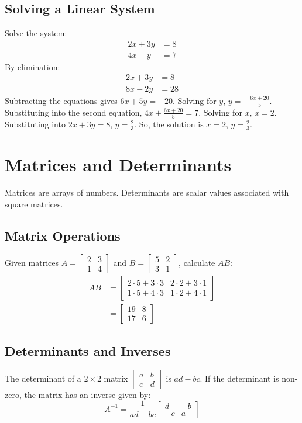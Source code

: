 \documentclass{article}
\begin{document}
\subsection{Solving a Linear System}
Solve the system:
\begin{align*}
    2x + 3y &= 8 \\
    4x - y &= 7
\end{align*}
By elimination:
\begin{align*}
    2x + 3y &= 8 \\
    8x - 2y &= 28
\end{align*}
Subtracting the equations gives $6x + 5y = -20$. Solving for $y$, $y = -\frac{6x + 20}{5}$. Substituting into the second equation, $4x + \frac{6x + 20}{5} = 7$. Solving for $x$, $x = 2$. Substituting into $2x + 3y = 8$, $y = \frac{2}{3}$. So, the solution is $x = 2$, $y = \frac{2}{3}$.

\section{Matrices and Determinants}
Matrices are arrays of numbers. Determinants are scalar values associated with square matrices.

\subsection{Matrix Operations}
Given matrices $A = \begin{bmatrix} 2 & 3 \\ 1 & 4 \end{bmatrix}$ and $B = \begin{bmatrix} 5 & 2 \\ 3 & 1 \end{bmatrix}$, calculate $AB$:
\begin{align*}
    AB &= \begin{bmatrix} 2 \cdot 5 + 3 \cdot 3 & 2 \cdot 2 + 3 \cdot 1 \\ 1 \cdot 5 + 4 \cdot 3 & 1 \cdot 2 + 4 \cdot 1 \end{bmatrix} \\
    &= \begin{bmatrix} 19 & 8 \\ 17 & 6 \end{bmatrix}
\end{align*}

\subsection{Determinants and Inverses}
The determinant of a $2 \times 2$ matrix $\begin{bmatrix} a & b \\ c & d \end{bmatrix}$ is $ad - bc$. If the determinant is non-zero, the matrix has an inverse given by:
\[ A^{-1} = \frac{1}{ad - bc} \begin{bmatrix} d & -b \\ -c & a \end{bmatrix} \]
\end{document}
